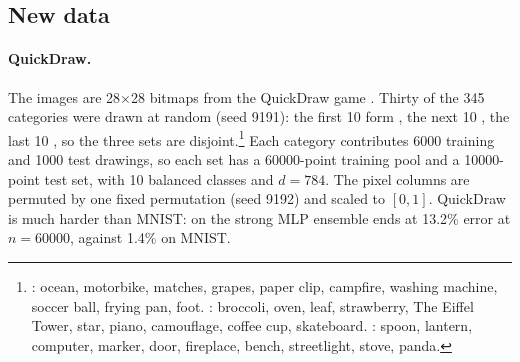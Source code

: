 \subsection{New data}\label{sec:p9data}

\paragraph{QuickDraw.} The images are 28$\times$28 bitmaps from the QuickDraw game \cite{ha2017sketch}. Thirty of the 345 categories were drawn at random (seed 9191): the first 10 form , the next 10 , the last 10 , so the three sets are disjoint.\footnote{: ocean, motorbike, matches, grapes, paper clip, campfire, washing machine, soccer ball, frying pan, foot. : broccoli, oven, leaf, strawberry, The Eiffel Tower, star, piano, camouflage, coffee cup, skateboard. : spoon, lantern, computer, marker, door, fireplace, bench, streetlight, stove, panda.} Each category contributes 6000 training and 1000 test drawings, so each set has a 60000-point training pool and a 10000-point test set, with 10 balanced classes and $d=784$. The pixel columns are permuted by one fixed permutation (seed 9192) and scaled to $[0,1]$. QuickDraw is much harder than MNIST: on  the strong MLP ensemble ends at 13.2\% error at $n=60000$, against 1.4\% on MNIST.

